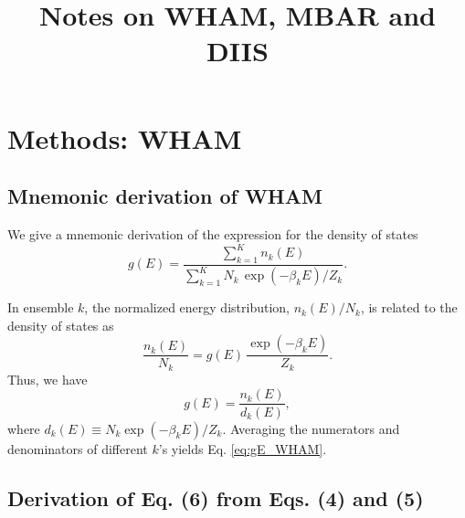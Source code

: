 \documentclass[aip,jcp,preprint,notitlepage, superscriptaddress]{revtex4-1}
\begin{document}
\renewcommand{\theequation}{N.\arabic{equation}}

\newcommand{\vct}[1]{\mathbf{#1}}
\newcommand{\vx}{\vct{x}}
\newcommand{\vy}{\vct{y}}
\newcommand{\Z}{\mathcal{Z}}
\newcommand{\E}{\mathcal{E}}
\newcommand{\Ham}{\mathcal{H}}
\newcommand{\W}{\mathcal{W}}




\title{Notes on WHAM, MBAR and DIIS}

\maketitle


\tableofcontents



\section{Methods: WHAM}



\subsection{Mnemonic derivation of WHAM}



We give a mnemonic derivation of the expression
for the density of states
%
\begin{equation}
g(E)
=
\frac{
  \sum_{k = 1}^K n_k(E)
}
{
  \sum_{k = 1}^K N_k \, \exp(-\beta_k E) / Z_k
}.
\label{eq:gE_WHAM}
\end{equation}
%

In ensemble $k$,
the normalized energy distribution,
$n_k(E) / N_k$,
is related to the density of states as
%
\begin{equation}
\frac{ n_k(E) } { N_k }
=
g(E) \,
\frac{ \exp(-\beta_k E) } { Z_k }.
\end{equation}
%
Thus,
we have
%
\begin{equation}
g(E)
=
\frac{ n_k(E) }
     { d_k(E) },
\label{eq:gE_single}
\end{equation}
where
$d_k(E) \equiv N_k \exp(-\beta_k E) / Z_k$.
%
Averaging the numerators and denominators of different $k$'s
yields Eq. \eqref{eq:gE_WHAM}.



\subsection{Derivation of Eq. (6) from Eqs. (4) and (5)}
\end{document}
